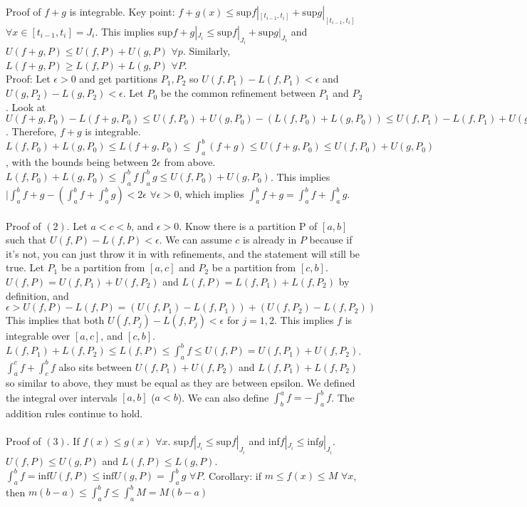 \documentclass[10pt,letter]{article}
\begin{document}
Proof of $f+g$ is integrable. Key point: $f+g(x)\leq \text{sup}f|_{[t_{i-1},t_i]}+\text{sup}g|_{[t_{i-1},t_i]}$ $\forall x\in[t_{i-1},t_i]=J_i$. This implies sup$f+g|_{J_i}\leq \text{sup}f|_{J_i}+\text{sup}g|_{J_i}$ and $U(f+g,P)\leq U(f,P) + U(g,P)$ $\forall p$. Similarly, $L(f+g,P)\geq L(f,P)+L(g,P)$ $\forall P$. \\ 
Proof: Let $\epsilon>0$ and get partitions $P_1,P_2$ so $U(f,P_1)-L(f,P_1)<\epsilon$ and $U(g,P_2)-L(g,P_2)<\epsilon$. Let $P_0$ be the common refinement between $P_1$ and $P_2$. Look at $U(f+g,P_0)-L(f+g,P_0)\leq U(f,P_0)+U(g,P_0)-(L(f,P_0)+L(g,P_0))\leq U(f,P_1)-L(f,P_1)+U(g,P_2)-L(g,P_2)< 2\epsilon$. Therefore, $f+g$ is integrable. 
$L(f,P_0)+L(g,P_0)\leq L(f+g,P_0)\leq \int_a^b(f+g)\leq U(f+g,P_0)\leq U(f,P_0)+U(g,P_0)$, with the bounds being between $2\epsilon$ from above. $L(f,P_0)+L(g,P_0)\leq \int_a^bf \int_a^bg\leq U(f,P_0)+U(g,P_0)$. This implies $|\int_a^bf+g - (\int_a^bf+\int_a^bg)<2\epsilon$ $\forall\epsilon>0$, which implies $\int_a^bf+g=\int_a^bf+\int_a^bg$. \\ \\ 

Proof of $(2)$. Let $a<c<b$, and $\epsilon>0$. Know there is a partition P of $[a,b]$ such that $U(f,P)-L(f,P)<\epsilon$. We can assume $c$ is already in $P$ because if it's not, you can just throw it in with refinements, and the statement will still be true. Let $P_1$ be a partition from $[a,c]$ and $P_2$ be a partition from $[c,b]$. $U(f,P)=U(f,P_1)+U(f,P_2)$ and $L(f,P)=L(f,P_1)+L(f,P_2)$ by definition, and $\epsilon>U(f,P)-L(f,P)=(U(f,P_1)-L(f,P_1))+(U(f,P_2)-L(f,P_2))$ This implies that both $U(f,P_j)-L(f,P_j)<\epsilon$ for $j=1,2$. This implies $f$ is integrable over $[a,c]$, and $[c,b]$. $L(f,P_1)+L(f,P_2)\leq L(f,P)\leq\int_a^bf\leq U(f,P)=U(f,P_1)+U(f,P_2)$. $\int_a^cf+\int_c^bf$ also sits between $U(f,P_1)+U(f,P_2)$ and $L(f,P_1)+L(f,P_2)$ so similar to above, they must be equal as they are between epsilon. We defined the integral over intervals $[a,b]$ ($a<b$). We can also define $\int_b^af=-\int_a^bf$. The addition rules continue to hold. \\ \\ 

Proof of $(3)$. If $f(x)\leq g(x)$ $\forall x$. sup$f|_{J_i}\leq \text{sup}f|_{J_i}$ and inf$f|_{J_i}\leq \text{inf}g|_{J_i}$. $U(f,P)\leq U(g,P)$ and $L(f,P)\leq L(g,P)$. $\int_a^bf=\text{inf}U(f,P)\leq\text{inf}U(g,P)=\int_a^bg$ $\forall P$. Corollary: if $m\leq f(x)\leq M$ $\forall x$, then $m(b-a)\leq\int_a^bf\leq \int_a^bM=M(b-a)$\\ \\ 
\end{document}
